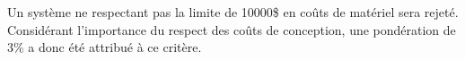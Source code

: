 Un système ne respectant pas la limite de 10000\$ en coûts de matériel sera rejeté. Considérant l'importance du respect des coûts de conception, une pondération de 3\% a donc été attribué à ce critère.








